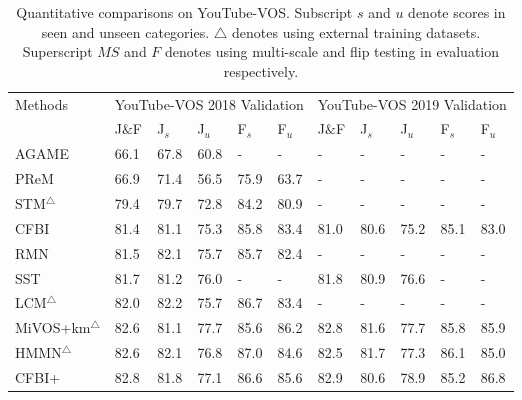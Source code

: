 \documentclass[letterpaper]{article} \usepackage{aaai22}  \usepackage{times}  \usepackage{helvet}  \usepackage{courier}  \usepackage[hyphens]{url}  \usepackage{graphicx} \urlstyle{rm} \def\UrlFont{\rm}  \usepackage{natbib}  \usepackage{caption} \DeclareCaptionStyle{ruled}{labelfont=normalfont,labelsep=colon,strut=off} \frenchspacing  \setlength{\pdfpagewidth}{8.5in}  \setlength{\pdfpageheight}{11in}  \usepackage{algorithm}
\begin{document}
\begin{table*}[ht]
\caption{Quantitative comparisons on YouTube-VOS. Subscript $s$ and $u$ denote scores in seen and unseen categories. $\bigtriangleup$ denotes using external training datasets. Superscript $MS$ and $F$ denotes using multi-scale and flip testing in evaluation respectively. } 
\centering
\setlength{\tabcolsep}{3.5mm}
\resizebox{\textwidth}{!}
    {

	\begin{tabular}{llllll|lllll}\toprule
		\multirow{2}{*}{Methods} &\multicolumn{5}{c}{YouTube-VOS 2018 Validation}  & \multicolumn{5}{c}{YouTube-VOS 2019 Validation}                                    \\
		\cmidrule(l){2-11}
		 & J$\&$F & J${}_{s}$ & J${}_{u}$ & F${}_{s}$ & F${}_{u}$ & J$\&$F & J${}_{s}$ & J${}_{u}$ & F${}_{s}$ & F${}_{u}$\\
 \midrule 
		AGAME {\cite{johnander2019generative}}&      66.1 & 67.8 & 60.8 & -     & -   & -     & -& -    &-&- \\
		PReM {\cite{luiten2018premvos}}&    66.9 & 71.4 & 56.5 & 75.9  & 63.7 & -     & -& -     & -  & -   \\
		
		
		STM${}^{\bigtriangleup}$ {\cite{oh2019video}}&      79.4 & 79.7 & 72.8 & 84.2  & 80.9 & -     & -& -     & -  & -   \\
		CFBI {\cite{yang2020collaborative}}&    81.4 & 81.1 & 75.3 & 85.8  & 83.4  &81.0 & 80.6 & 75.2 & 85.1  & 83.0\\		
		RMN {\cite{xie2021efficient}}&         81.5&82.1&75.7& 85.7&82.4 & -     & -& -     & -  & -    \\
		SST {\cite{duke2021sstvos}}&       81.7&81.2&76.0& -&-  & 81.8&80.9&76.6     & -  & -    \\
		LCM${}^{\bigtriangleup}$ {\cite{hu2021learning}}&  82.0&82.2&75.7& {86.7}&83.4 & -     & -& -     & -    & -  \\	
		MiVOS+km${}^{\bigtriangleup}$ {\cite{cheng2021modular}}&  82.6 & 81.1 &77.7&85.6&86.2 &  82.8 & 81.6 &77.7&85.8&85.9       \\
        HMMN${}^{\bigtriangleup}${\cite{seong2021hierarchical}}&   82.6 & 82.1& 76.8&87.0&84.6 & 82.5 & 81.7 &77.3&86.1&85.0     \\
		CFBI+ {\cite{yang2021collaborative}}&   82.8 & 81.8 &77.1&86.6&85.6 & 82.9 & 80.6 &78.9&85.2&86.8     \\
		


\end{tabular}}
\end{table*}
\end{document}
